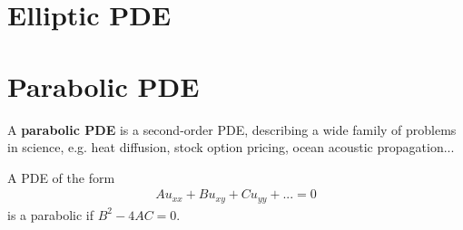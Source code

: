 \section{Elliptic PDE}
\label{sec:elliptic-pde}


\section{Parabolic PDE}
\label{sec:parabolic-pde}

A {\bf parabolic PDE} is a second-order PDE, describing a wide family
of problems in science, e.g. heat diffusion, stock option pricing,
ocean acoustic propagation...

A PDE of the form
\begin{eqnarray*}
  Au_{xx}+Bu_{xy}+Cu_{yy}+... = 0
\end{eqnarray*}
is a parabolic if $B^2-4AC=0$.



